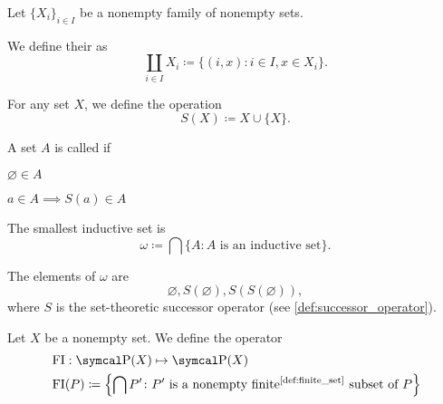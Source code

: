 \begin{definition}\label{def:disjoint_union}
  Let \( \{ X_i \}_{i \in I} \) be a nonempty family of nonempty sets.

  We define their  as
  \begin{equation*}
    \coprod_{i \in I} X_i \coloneqq \{ (i, x) \colon i \in I, x \in X_i \}.
  \end{equation*}
\end{definition}

\begin{definition}\label{def:successor_operator}\cite[68]{Enderton1977}
  For any set \( X \), we define the  operation
  \begin{equation*}
    S(X) \coloneqq X \cup \{ X \}.
  \end{equation*}
\end{definition}

\begin{definition}\label{def:inductive_set}\cite[68]{Enderton1977}
  A set \( A \) is called  if
  \begin{defenum}
    \item \( \varnothing \in A \)
    \item \( a \in A \implies S(a) \in A \)
  \end{defenum}
\end{definition}

\begin{definition}\label{def:smallest_inductive_set}
  The smallest inductive set is
  \begin{equation*}
    \omega \coloneqq \bigcap \{ A \colon A \text{ is an inductive set} \}.
  \end{equation*}

  The elements of \( \omega \) are
  \begin{equation*}
    \varnothing, S(\varnothing), S(S(\varnothing)),
  \end{equation*}
  where \( S \) is the set-theoretic successor operator (see \cref{def:successor_operator}).
\end{definition}

\begin{definition}\label{def:finite_intersection_operator}
  Let \( X \) be a nonempty set. We define the  operator
  \begin{align*}
    &\FI: \Power(X) \mapsto \Power(X) \\
    &\FI(P) \coloneqq \left\{ \bigcap P' \colon P' \text{ is a nonempty finite\Tinyref{def:finite_set} subset of } P \right\}
  \end{align*}
\end{definition}

